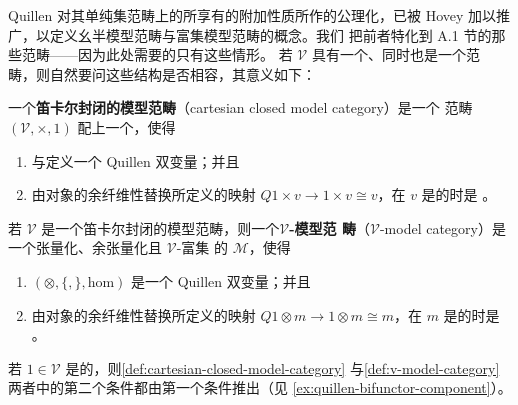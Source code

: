Quillen 对其单纯集范畴上的\trModelStructure{}所享有的附加性质所作的公理化，已被
Hovey \cite[§4.2]{bib57} 加以推广，以定义幺半模型范畴与富集模型范畴的概念。我们
把前者特化到 A.1 节的那些\trCartesianClosed{}范畴——因为此处需要的只有这些情形。
若 $\mathcal{V}$ 具有一个\trModelStructure、同时也是一个\trCartesianClosed{}范
畴，则自然要问这些结构是否相容，其意义如下：

\begin{definition}\label{def:cartesian-closed-model-category}
一个\textbf{笛卡尔封闭的模型范畴}（cartesian closed model category）是一个%
\trCartesianClosed{}范畴 $(\mathcal{V},\times,1)$ 配上一个\trModelStructure，使得
\begin{enumerate}[label=(\roman*)]
\item \trCartesianProduct{}与\trInternalHom{}定义一个 Quillen 双变量\trAdjunction；并且
\item 由\trTerminal{}对象的余纤维性替换所定义的映射
  $Q1\times v\to 1\times v\cong v$，在 $v$ 是\trCofibrant{}的时是%
\trWeakEquivalence。
\end{enumerate}
\end{definition}

\begin{definition}\label{def:v-model-category}
若 $\mathcal{V}$ 是一个笛卡尔封闭的模型范畴，则一个\textbf{$\mathcal{V}$-模型范
畴}（$\mathcal{V}$-model category）是一个张量化、余张量化且 $\mathcal{V}$-富集
的\trModelCategory{} $\mathcal{M}$，使得
\begin{enumerate}[label=(\roman*)]
\item $(\otimes,\{,\},\mathrm{hom})$ 是一个 Quillen 双变量\trAdjunction；并且
\item 由\trTerminal{}对象的余纤维性替换所定义的映射
  $Q1\otimes m\to 1\otimes m\cong m$，在 $m$ 是\trCofibrant{}的时是%
\trWeakEquivalence。
\end{enumerate}
\end{definition}

若 $1\in\mathcal{V}$ 是\trCofibrant{}的，则\cref{def:cartesian-closed-model-category}%
与\cref{def:v-model-category}两者中的第二个条件都由第一个条件推出（见%
\cref{ex:quillen-bifunctor-component}）。

